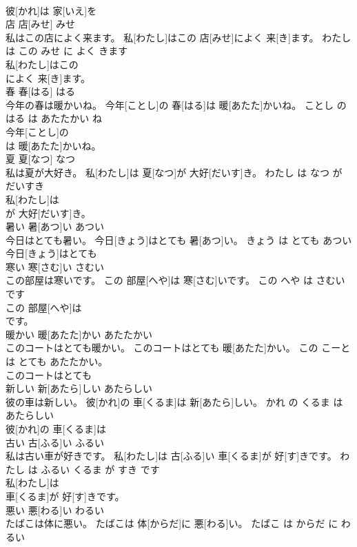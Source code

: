 \documentclass[8pt]{extreport}
\begin{document}
\begin{CJK}{UTF8}{min}
\\	彼[かれ]は 家[いえ]を
\\	店	店[みせ]	みせ	
\\	私はこの店によく来ます。	私[わたし]はこの 店[みせ]によく 来[き]ます。	わたし は この みせ に よく きます	
\\	私[わたし]はこの
\\	によく 来[き]ます。			
\\	春	春[はる]	はる	
\\	今年の春は暖かいね。	今年[ことし]の 春[はる]は 暖[あたた]かいね。	ことし の はる は あたたかい ね	
\\	今年[ことし]の
\\	は 暖[あたた]かいね。			
\\	夏	夏[なつ]	なつ	
\\	私は夏が大好き。	私[わたし]は 夏[なつ]が 大好[だいす]き。	わたし は なつ が だいすき	
\\	私[わたし]は
\\	が 大好[だいす]き。			
\\	暑い	暑[あつ]い	あつい	
\\	今日はとても暑い。	今日[きょう]はとても 暑[あつ]い。	きょう は とても あつい	
\\	今日[きょう]はとても
\\	寒い	寒[さむ]い	さむい	
\\	この部屋は寒いです。	この 部屋[へや]は 寒[さむ]いです。	この へや は さむい です	
\\	この 部屋[へや]は
\\	です。			
\\	暖かい	暖[あたた]かい	あたたかい	
\\	このコートはとても暖かい。	このコートはとても 暖[あたた]かい。	この こーと は とても あたたかい。	
\\	このコートはとても
\\	新しい	新[あたら]しい	あたらしい	
\\	彼の車は新しい。	彼[かれ]の 車[くるま]は 新[あたら]しい。	かれ の くるま は あたらしい	
\\	彼[かれ]の 車[くるま]は
\\	古い	古[ふる]い	ふるい	
\\	私は古い車が好きです。	私[わたし]は 古[ふる]い 車[くるま]が 好[す]きです。	わたし は ふるい くるま が すき です	
\\	私[わたし]は
\\	車[くるま]が 好[す]きです。			
\\	悪い	悪[わる]い	わるい	
\\	たばこは体に悪い。	たばこは 体[からだ]に 悪[わる]い。	たばこ は からだ に わるい	

\end{CJK}
\end{document}
